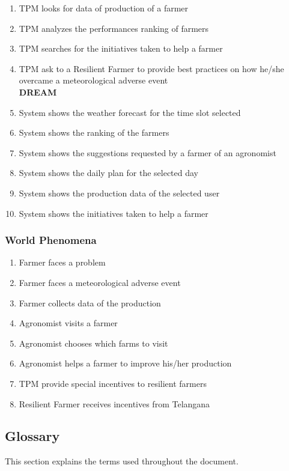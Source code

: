 \begin{enumerate}[label=\textbf{SP.\arabic*}]
    \item TPM looks for data of production of a farmer
    \item TPM analyzes the performances ranking of farmers
    \item TPM searches for the initiatives taken to help a farmer
    \item TPM ask to a Resilient Farmer to provide best practices on how he/she overcame a meteorological adverse event\newline
    \\
\textbf{DREAM}
    \item System shows the weather forecast for the time slot selected
    \item System shows the ranking of the farmers
    \item System shows the suggestions requested by a farmer of an agronomist
    \item System shows the daily plan for the selected day
    \item System shows the production data of the selected user
    \item System shows the initiatives taken to help a farmer
\end{enumerate}

\subsubsection{World Phenomena}
\begin{enumerate}[label=\textbf{WP.\arabic*}]
    \item Farmer faces a problem
    \item Farmer faces a meteorological adverse event
    \item Farmer collects data of the production
    \item Agronomist visits a farmer
    \item Agronomist chooses which farms to visit
    \item Agronomist helps a farmer to improve his/her production
    \item TPM provide special incentives to resilient farmers
    \item Resilient Farmer receives incentives from Telangana
\end{enumerate}
\newpage
\subsection{Glossary}
This section explains the terms used throughout the document.

